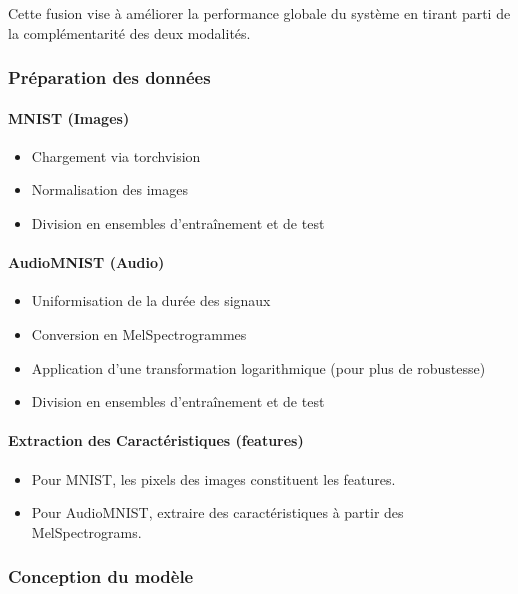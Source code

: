 \documentclass{article}
\begin{document}
Cette fusion vise à améliorer la performance globale du système en tirant parti de la complémentarité des deux modalités.

\subsubsection{Préparation des données}
\label{subsubsec:prep_multi}

\paragraph{MNIST (Images)}
\begin{itemize}
    \item Chargement via torchvision
    \item Normalisation des images
    \item Division en ensembles d'entraînement et de test
\end{itemize}

\paragraph{AudioMNIST (Audio)}
\begin{itemize}
    \item Uniformisation de la durée des signaux
    \item Conversion en MelSpectrogrammes
    \item Application d'une transformation logarithmique (pour plus de robustesse)
    \item Division en ensembles d'entraînement et de test
\end{itemize}

\paragraph{Extraction des Caractéristiques (features)}
\begin{itemize}
    \item Pour MNIST, les pixels des images constituent les features.
    \item Pour AudioMNIST, extraire des caractéristiques à partir des MelSpectrograms.
\end{itemize}

\subsubsection{Conception du modèle}
\label{subsubsec:conception}
\end{document}
